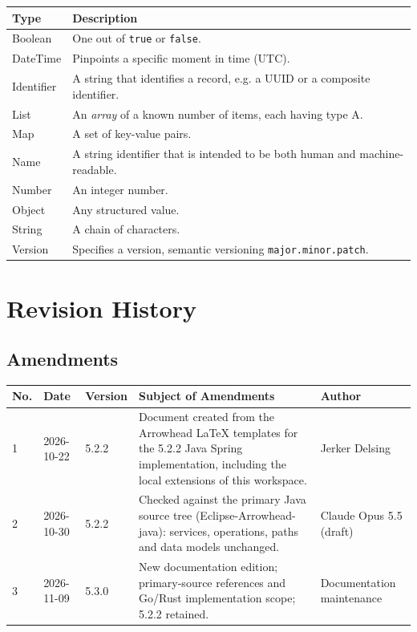 \documentclass[a4paper]{arrowhead}
\newcommand{\pdef}[1]{{\textcolor{ArrowheadGrey}{#1\label{sec:model:primitives:#1}\label{sec:model:primitives:#1s}\label{sec:model:primitives:#1es}}}}
\begin{document}
\noindent\begin{tabularx}{\textwidth}{| p{4.6cm} | X |} \hline
\rowcolor{gray!33} Type & Description \\ \hline
\pdef{Boolean} & One out of \texttt{true} or \texttt{false}. \\ \hline
\pdef{DateTime} & Pinpoints a specific moment in time (UTC). \\ \hline
\pdef{Identifier} & A string that identifies a record, e.g. a UUID or a composite identifier. \\ \hline
\pdef{List} & An \textit{array} of a known number of items, each having type A. \\ \hline
\pdef{Map} & A set of key-value pairs. \\ \hline
\pdef{Name} & A string identifier that is intended to be both human and machine-readable. \\ \hline
\pdef{Number} & An integer number. \\ \hline
\pdef{Object} & Any structured value. \\ \hline
\pdef{String} & A chain of characters. \\ \hline
\pdef{Version} & Specifies a version, semantic versioning \texttt{major.minor.patch}. \\ \hline
\end{tabularx}

\newpage




\newpage

\section{Revision History}
\subsection{Amendments}

\noindent\begin{tabularx}{\textwidth}{| p{1cm} | p{3cm} | p{2cm} | X | p{4cm} |} \hline
\rowcolor{gray!33} No. & Date & Version & Subject of Amendments & Author \\ \hline

1 & 2026-10-22 & 5.2.2 & Document created from the Arrowhead LaTeX templates for the 5.2.2 Java Spring implementation, including the local extensions of this workspace. & Jerker Delsing \\ \hline
2 & 2026-10-30 & 5.2.2 & Checked against the primary Java source tree (Eclipse-Arrowhead-java): services, operations, paths and data models unchanged. & Claude Opus 5.5 (draft) \\ \hline
3 & 2026-11-09 & 5.3.0 & New documentation edition; primary-source references and Go/Rust implementation scope; 5.2.2 retained. & Documentation maintenance \\ \hline
\end{tabularx}
\end{document}
